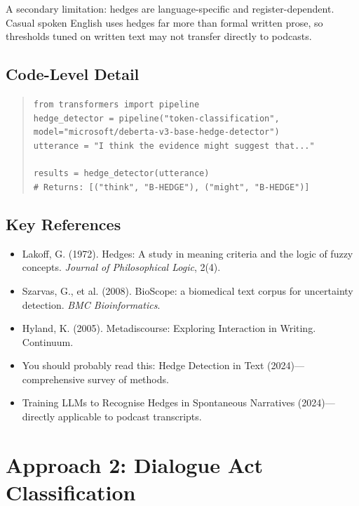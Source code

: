 \documentclass[11pt,letterpaper]{article}
\begin{document}
A secondary limitation: hedges are language-specific and register-dependent. Casual spoken English uses hedges far more than formal written prose, so thresholds tuned on written text may not transfer directly to podcasts.

\subsection{Code-Level Detail}

\begin{quote}
\texttt{from transformers import pipeline\\
hedge\_detector = pipeline("token-classification",\\
  model="microsoft/deberta-v3-base-hedge-detector")\\
utterance = "I think the evidence might suggest that..."}\\
\\
\texttt{results = hedge\_detector(utterance)\\
\# Returns: [("think", "B-HEDGE"), ("might", "B-HEDGE")]}
\end{quote}

\subsection{Key References}

\begin{itemize}
  \item Lakoff, G. (1972). Hedges: A study in meaning criteria and the logic of fuzzy concepts. \textit{Journal of Philosophical Logic}, 2(4).
  \item Szarvas, G., et al. (2008). BioScope: a biomedical text corpus for uncertainty detection. \textit{BMC Bioinformatics}.
  \item Hyland, K. (2005). Metadiscourse: Exploring Interaction in Writing. Continuum.
  \item You should probably read this: Hedge Detection in Text (2024)—comprehensive survey of methods.
  \item Training LLMs to Recognise Hedges in Spontaneous Narratives (2024)—directly applicable to podcast transcripts.
\end{itemize}

\section{Approach 2: Dialogue Act Classification}
\end{document}
